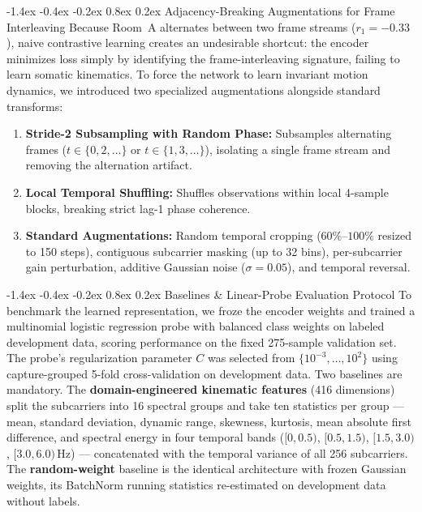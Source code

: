 \documentclass[10pt,a4paper]{article}
\makeatletter
\renewcommand{\subsection}{\@startsection{subsection}{2}{\z@}%
  {-1.4ex \@plus -0.4ex \@minus -0.2ex}%
  {0.8ex \@plus 0.2ex}%
  {\normalfont\normalsize\bfseries\color{secondary}}}
\makeatother
\begin{document}
\subsection{Adjacency-Breaking Augmentations for Frame Interleaving}
Because Room~A alternates between two frame streams ($r_1 = -0.33$), naive contrastive learning creates an undesirable shortcut: the encoder minimizes loss simply by identifying the frame-interleaving signature, failing to learn somatic kinematics. To force the network to learn invariant motion dynamics, we introduced two specialized augmentations alongside standard transforms:
\begin{enumerate}
    \item \textbf{Stride-2 Subsampling with Random Phase:} Subsamples alternating frames ($t \in \{0, 2, \dots\}$ or $t \in \{1, 3, \dots\}$), isolating a single frame stream and removing the alternation artifact.
    \item \textbf{Local Temporal Shuffling:} Shuffles observations within local 4-sample blocks, breaking strict lag-1 phase coherence.
    \item \textbf{Standard Augmentations:} Random temporal cropping ($60\%$--$100\%$ resized to 150 steps), contiguous subcarrier masking (up to 32 bins), per-subcarrier gain perturbation, additive Gaussian noise ($\sigma = 0.05$), and temporal reversal.
\end{enumerate}

\subsection{Baselines \& Linear-Probe Evaluation Protocol}
To benchmark the learned representation, we froze the encoder weights and trained a multinomial logistic regression probe with balanced class weights on labeled development data, scoring performance on the fixed 275-sample validation set. The probe's regularization parameter $C$ was selected from $\{10^{-3}, \dots, 10^{2}\}$ using capture-grouped 5-fold cross-validation on development data. Two baselines are mandatory. The \textbf{domain-engineered kinematic features} (416 dimensions) split the subcarriers into 16 spectral groups and take ten statistics per group --- mean, standard deviation, dynamic range, skewness, kurtosis, mean absolute first difference, and spectral energy in four temporal bands ($[0,0.5)$, $[0.5,1.5)$, $[1.5,3.0)$, $[3.0,6.0)$\,Hz) --- concatenated with the temporal variance of all 256 subcarriers. The \textbf{random-weight} baseline is the identical architecture with frozen Gaussian weights, its BatchNorm running statistics re-estimated on development data without labels.
\end{document}
